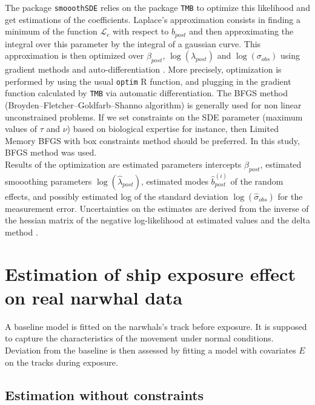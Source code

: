 \documentclass[11pt]{article}
\newcommand {\1}{\mathbb{1}}
\begin{document}
The package \texttt{smooothSDE} relies on the package \texttt{TMB} to optimize this likelihood and get estimations of the coefficients.
Laplace's approximation consists in finding a minimum of the function $\mathcal{L}_c$ with respect to $b_{post}$ and then approximating the integral over this parameter by the integral of a gaussian curve.
This approximation is then optimized over $\beta_{post}$, $\log(\lambda_{post})$ and $\log(\sigma_{obs})$ using gradient methods and auto-differentiation \cite{kristensen_tmb_2016}. More precisely, optimization is  performed by using the usual \texttt{optim} R function, and plugging in the gradient function calculated by \texttt{TMB} via automatic differentiation. The BFGS method (Broyden–Fletcher–Goldfarb–Shanno algorithm) is generally used for non linear unconstrained problems. If we set constraints on the SDE parameter (maximum values of $\tau$ and $\nu$) based on biological expertise for instance, then Limited Memory BFGS with box constraints method should be preferred. In this study, BFGS method was used.\\
Results of the optimization are estimated parameters intercepts $\hat{\beta}_{post}$, estimated smooothing parameters $\log(\hat{\lambda}_{post})$, estimated modes $\hat{b}_{post}^{(i)}$ of the random effects, and possibly estimated log of the standard deviation $\log(\hat{\sigma}_{obs})$ for the measurement error.
Uncertainties on the estimates are derived from the inverse of the hessian matrix of the negative log-likelihood at estimated values and the delta method \cite{kristensen_tmb_2016}.




\section{Estimation of ship exposure effect on real narwhal data}

A baseline model is fitted on the narwhals's track before exposure. It is supposed to capture the characteristics of the movement under normal conditions. Deviation from the baseline is then assessed by fitting a model with covariates $E$ on the tracks during exposure.

\subsection{Estimation without constraints}
\end{document}

